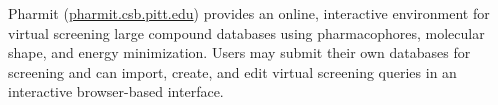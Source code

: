 Pharmit (\url{pharmit.csb.pitt.edu}) provides an online, interactive environment for virtual screening large compound databases using pharmacophores, molecular shape, and energy minimization.  Users may submit their own databases for screening and can import, create, and edit virtual screening queries in an interactive browser-based interface.
